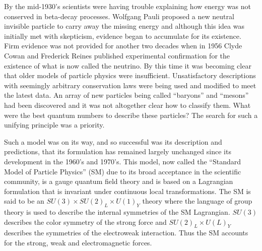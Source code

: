 By the mid-1930's scientists were having trouble explaining how energy was not conserved in beta-decay processes. Wolfgang Pauli proposed a new neutral invisible particle to carry away the missing energy and although this idea was initially met with skepticism, evidence began to accumulate for its existence. Firm evidence was not provided for another two decades when in 1956 Clyde Cowan and Frederick Reines published experimental confirmation for the existence of what is now called the neutrino. By this time it was becoming clear that older models of particle physics were insufficient. Unsatisfactory descriptions with seemingly arbitrary conservation laws were being used and modified to meet the latest data. An array of new particles being called ``baryons'' and ``mesons'' had been discovered and it was not altogether clear how to classify them. What were the best quantum numbers to describe these particles? The search for such a unifying principle was a priority. 

Such a model was on its way, and so successful was its description and predictions, that its formulation has remained largely unchanged since its development in the 1960's and 1970's. This model, now called the ``Standard Model of Particle Physics'' (SM) due to its broad acceptance in the scientific community, is a gauge quantum field theory and is based on a Lagrangian formulation that is invariant under continuous local transformations. The SM is said to be  an $SU(3)\times SU(2)_L\times U(1)_Y$ theory where the language of group theory is used to describe the internal symmetries of the SM Lagrangian.  $SU(3)$ describes the color symmetry of the strong force and $SU(2)_L\times U(L)_Y$ describes the symmetries of the electroweak interaction. Thus the SM accounts for the strong, weak and electromagnetic forces.

